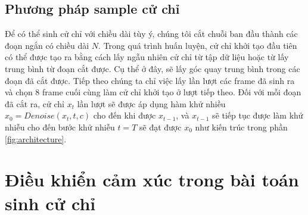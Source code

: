 \subsection{Phương pháp sample cử chỉ}


Để có thể sinh cử chỉ với chiều dài tùy ý, chúng tôi cắt chuỗi ban đầu thành các đoạn ngắn có chiều dài $N$. Trong quá trình huấn luyện, cử chỉ khởi tạo đầu tiên có thể được tạo ra bằng cách lấy ngẫu nhiên cử chỉ từ tập dữ liệu hoặc từ lấy trung bình từ đoạn cắt được. Cụ thể ở đây, sẽ lấy góc quay trung bình trong các đoạn đã cắt được. Tiếp theo chúng ta chỉ việc lấy lần lượt các frame đã sinh ra và chọn $8$ frame cuối cùng làm cử chỉ khởi tạo ở lượt tiếp theo. Đối với mỗi đoạn đã cắt ra, cử chỉ $x_{t}$ lần lượt sẽ được áp dụng hàm khử nhiều $\hat{x}_{0} = Denoise \left(x_{t}, t, c\right)$ cho đến khi được  $x_{t-1}$, và $x_{t-1}$ sẽ tiếp tục được làm khử nhiễu cho đến bước khử nhiễu $t=T$ sẽ đạt được $x_{0}$ như kiến trúc trong phần \autoref{fig:architecture}.



\section{Điều khiển cảm xúc trong bài toán sinh cử chỉ}

